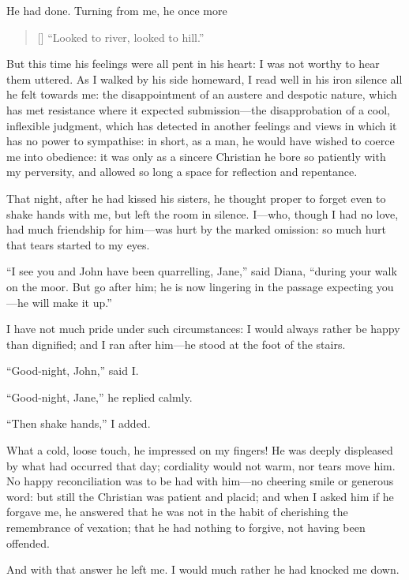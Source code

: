 He had done. Turning from me, he once more

\begin{verse}[\versewidth]
\enquote{Looked to river, looked to hill.}
\end{verse}

But this time his feelings were all pent in his heart: I was not worthy
to hear them uttered. As I walked by his side homeward, I read well in
his iron silence all he felt towards me: the disappointment of an
austere and despotic nature, which has met resistance where it expected
submission---the disapprobation of a cool, inflexible judgment, which
has detected in another feelings and views in which it has no power to
sympathise: in short, as a man, he would have wished to coerce me into
obedience: it was only as a sincere Christian he bore so patiently with
my perversity, and allowed so long a space for reflection and
repentance.

That night, after he had kissed his sisters, he thought proper to forget
even to shake hands with me, but left the room in silence. I---who,
though I had no love, had much friendship for him---was hurt by the
marked omission: so much hurt that tears started to my eyes.

\enquote{I see you and \St{} John have been quarrelling, Jane,} said
Diana, \enquote{during your walk on the moor. But go after him; he is
now lingering in the passage expecting you---he will make it up.}

I have not much pride under such circumstances: I would always rather be
happy than dignified; and I ran after him---he stood at the foot of the
stairs.

\enquote{Good-night, \St{} John,} said I\@.

\enquote{Good-night, Jane,} he replied calmly.

\enquote{Then shake hands,} I added.

What a cold, loose touch, he impressed on my fingers! He was deeply
displeased by what had occurred that day; cordiality would not warm, nor
tears move him. No happy reconciliation was to be had with him---no
cheering smile or generous word: but still the Christian was patient and
placid; and when I asked him if he forgave me, he answered that he was
not in the habit of cherishing the remembrance of vexation; that he had
nothing to forgive, not having been offended.

And with that answer he left me. I would much rather he had knocked me
down.
